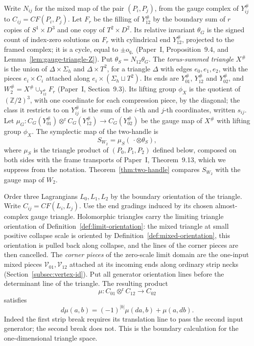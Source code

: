 \documentclass[11pt]{amsart}
\theoremstyle{definition}
\theoremstyle{remark}
\theoremstyle{plain}
\numberwithin{equation}{section}
\newcommand{\ZZ}{\mathbb Z}
\newcommand{\CF}{\mathit{CF}}
\begin{document}
Write $N_{ij}$ for the mixed map of the pair $(P_i,P_j)$, from the gauge
complex of $Y_{ij}^\#$ to $C_{ij}=\CF(P_i,P_j)$. Let $F_r$ be the filling
of $Y_{12}^\#$ by the boundary sum of $r$ copies of $S^1\times D^3$ and one
copy of $T^2\times D^2$. Its relative invariant $\theta_G$ is the signed
count of index-zero solutions on $F_r$ with cylindrical end $Y_{12}^\#$,
projected to the framed complex; it is a cycle, equal to $\pm o_{q_*}$
(Paper~I, Proposition~9.4, and Lemma~\ref{lem:gauge-triangle-Z}). Put
$\theta_S=N_{12}\theta_G$. The \emph{torus-summed triangle} $X^\#$ is the
union of $\Delta\times\Sigma_h$ and $\Delta\times T^2$, for a triangle
$\Delta$ with edges $e_0,e_1,e_2$, with the pieces $e_i\times C_i$ attached
along $e_i\times(\Sigma_h\sqcup T^2)$. Its ends are $Y_{01}^\#$,
$Y_{12}^\#$ and $Y_{02}^\#$, and $W_2^\#=X^\#\cup_{Y_{12}^\#}F_r$
(Paper~I, Section~9.3). Its lifting group $\phi_X$ is the quotient of
$(\ZZ/2)^3$, with one coordinate for each compression piece, by the
diagonal; the class it restricts to on $Y_{ij}^\#$ is the sum of the
$i$-th and $j$-th coordinates, written $s_{ij}$. Let
$\mu_G\colon C_G(Y_{01}^\#)\otimes^{\mathrm r} C_G(Y_{12}^\#)\to C_G(Y_{02}^\#)$ be
the gauge map of $X^\#$ with lifting group $\phi_X$. The symplectic map of the
two-handle is
\[
 S_{W_2}=\mu_S(\,\cdot\otimes\theta_S),
\]
where $\mu_S$ is the triangle product of $(P_0,P_1,P_2)$ defined below,
composed on both sides with the frame transports of Paper~I,
Theorem~9.13, which we suppress from the notation.
Theorem~\ref{thm:two-handle} compares $S_{W_2}$ with the gauge map
of $W_2$.

Order three Lagrangians $L_0,L_1,L_2$ by the boundary
orientation of the triangle. Write $C_{ij}=\CF(L_i,L_j)$.
Use the end gradings induced by its chosen almost-complex gauge
triangle. Holomorphic triangles carry the limiting triangle orientation
of Definition~\ref{def:limit-orientation}: the mixed triangle at small
positive collapse scale is oriented by
Definition~\ref{def:mixed-orientation}, this orientation is pulled back
along collapse, and the lines of the corner pieces are then cancelled.
The \emph{corner pieces} of the zero-scale limit domain are the one-input
mixed pieces $\mathcal V_{01},\mathcal V_{12}$ attached at its incoming
ends along ordinary strip necks (Section~\ref{subsec:vertex-id}). Put all generator orientation lines before the determinant line of the
triangle.
The resulting product
\[
 \mu:C_{01}\otimes^{\mathrm r} C_{12}\longrightarrow C_{02}
\]
satisfies
\begin{equation}\label{eq:leibniz}
 d\mu(a,b)=(-1)^{|b|}\mu(da,b)+\mu(a,db).
\end{equation}
Indeed the first strip break requires its translation
line to pass the second input generator; the second
break does not. This is the boundary calculation for
the one-dimensional triangle space.
\end{document}
